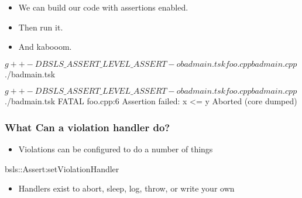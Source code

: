 \begin{frame}[fragile]
\begin{overprint}
  \begin{itemize}
  \item<1->{We can build our code with assertions enabled.}
  \item<2->{Then run it.}
  \item<3->{And kabooom.}
  \end{itemize}
\end{overprint}

\begin{overprint}


\begin{shellbox}
$ g++ -DBSLS\_ASSERT\_LEVEL\_ASSERT -o badmain.tsk foo.cpp badmain.cpp
$ ./badmain.tsk
\end{shellbox}

\begin{shellbox}
$ g++ -DBSLS\_ASSERT\_LEVEL\_ASSERT -o badmain.tsk foo.cpp badmain.cpp
$ ./badmain.tsk
FATAL foo.cpp:6 Assertion failed: x <= y
Aborted (core dumped)
\end{shellbox}

\end{overprint}
\end{frame}

\begin{frame}[fragile]
  \frametitle{What Can a violation handler do?}
  \begin{itemize}
  \item{Violations can be configured to do a number of things} \pause
  \end{itemize}
  \begin{cppcodebox}
    bsls::Assert:setViolationHandler
  \end{cppcodebox}
  \begin{itemize} \pause
  \item{Handlers exist to abort, sleep, log, throw, or write your own}
  \end{itemize}
\end{frame}

